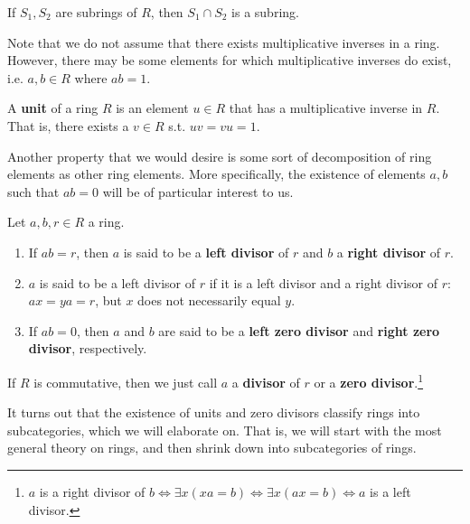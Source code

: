   \begin{theorem}
    If $S_1, S_2$ are subrings of $R$, then $S_1 \cap S_2$ is a subring. 
  \end{theorem}

  Note that we do not assume that there exists multiplicative inverses in a ring. However, there may be some elements for which multiplicative inverses do exist, i.e. $a, b \in R$ where $ab = 1$.  

  \begin{definition}[Unit]
    A \textbf{unit} of a ring $R$ is an element $u \in R$ that has a multiplicative inverse in $R$. That is, there exists a $v \in R$ s.t. $uv = vu = 1$. 
  \end{definition}

  Another property that we would desire is some sort of decomposition of ring elements as other ring elements. More specifically, the existence of elements $a, b$ such that $ab = 0$ will be of particular interest to us. 

  \begin{definition}
    Let $a, b, r \in R$ a ring. 
    \begin{enumerate}
      \item If $ab = r$, then $a$ is said to be a \textbf{left divisor} of $r$ and $b$ a \textbf{right divisor} of $r$. 

      \item $a$ is said to be a left divisor of $r$ if it is a left divisor and a right divisor of $r$: $ax = ya = r$, but $x$ does not necessarily equal $y$. 

      \item If $ab = 0$, then $a$ and $b$ are said to be a \textbf{left zero divisor} and \textbf{right zero divisor}, respectively. 
    \end{enumerate}
    If $R$ is commutative, then we just call $a$ a \textbf{divisor} of $r$ or a \textbf{zero divisor}.\footnote{$a$ is a right divisor of $b \iff \exists x (xa = b) \iff \exists x (ax = b) \iff a$ is a left divisor. } 
  \end{definition}

  It turns out that the existence of units and zero divisors classify rings into subcategories, which we will elaborate on. That is, we will start with the most general theory on rings, and then shrink down into subcategories of rings. 


